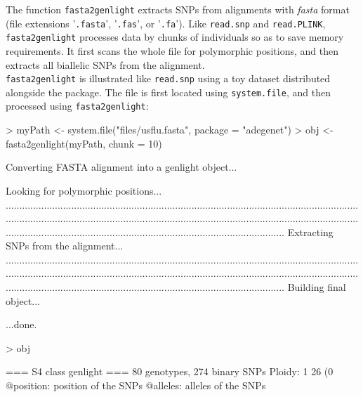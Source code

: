 \documentclass{article}
\begin{document}
The function \texttt{fasta2genlight} extracts SNPs from alignments with \textit{fasta} format (file
extensions '\texttt{.fasta}', '\texttt{.fas}', or '\texttt{.fa}').
Like \texttt{read.snp} and \texttt{read.PLINK}, \texttt{fasta2genlight} processes data by chunks of
individuals so as to save memory requirements.
It first scans the whole file for polymorphic positions, and then extracts all biallelic SNPs from
the alignment.
\\

\texttt{fasta2genlight} is illustrated like \texttt{read.snp} using a toy dataset distributed
alongside the package.
The file is first located using \texttt{system.file}, and then processed using \texttt{fasta2genlight}:
\begin{Schunk}
\begin{Sinput}
> myPath <- system.file("files/usflu.fasta", package = "adegenet")
> obj <- fasta2genlight(myPath, chunk = 10)
\end{Sinput}
\begin{Soutput}
 Converting FASTA alignment into a genlight object... 


 Looking for polymorphic positions... 
........................................................................................................................................................................................................................................................................................................................................................................
 Extracting SNPs from the alignment... 
........................................................................................................................................................................................................................................................................................................................................................................
 Building final object... 

...done.
\end{Soutput}
\begin{Sinput}
> obj
\end{Sinput}
\begin{Soutput}
 === S4 class genlight ===
 80 genotypes,  274 binary SNPs
 Ploidy: 1
 26 (0 %
 @position: position of the SNPs
 @alleles: alleles of the SNPs
\end{Soutput}
\end{Schunk}
\end{document}
